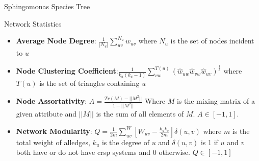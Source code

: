 \documentclass[dvipsnames]{beamer}
\begin{document}
\begin{frame}[fragile]{Sphingomonas Species Tree}
\end{frame}
\begin{frame}[fragile]{Network Statistics}
    \begin{itemize}
        \item \textbf{Average Node Degree}: $\frac{1}{|N_u|}\sum_{uv}^{N_u} w_{uv}$ where $N_u$ is the set of nodes incident to $u$
        \item \textbf{Node Clustering Coefficient}:$\frac{1}{k_u(k_u-1)} \sum_{vw}^{T(u)} (\hat{w}_{uw} \hat{w}_{vw} \hat{w}_{uv})^{\frac{1}{3}}$ where $T(u)$ is the set of triangles containing $u$ \autocite{clustering}
        \item \textbf{Node Assortativity}: $A = \frac{Tr(M)-||M^2||}{1-||M^2||}$ Where $M$ is the mixing matrix of a given attribute and $||M||$ is the sum of all elements of $M$. $A \in [-1,1]$. \autocite{newmanmix}
        \item \textbf{Network Modularity}: $Q=\frac{1}{2m}\sum_{uv}^W [W_{uv} - \frac{k_u k_v}{2m}]\delta(u,v)$ where $m$ is the total weight of alledges, $k_u$ is the degree of $u$ and $\delta(u,v)$ is 1 if $u$ and $v$ both have or do not have \ac{crsp} systems and 0 otherwise. $Q \in [-1,1]$ \autocite{modularity}
    \end{itemize}
\end{frame}
\end{document}
